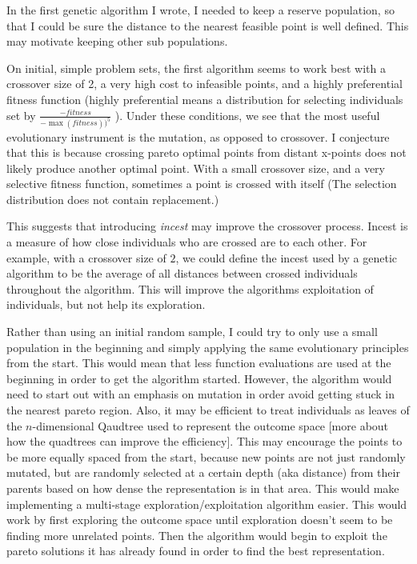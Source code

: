 \documentclass{article}
\begin{document}
In the first genetic algorithm I wrote, I needed to keep a reserve population, so that I could be sure the distance to the nearest feasible point is well defined.
This may motivate keeping other sub populations.


On initial, simple problem sets, the first algorithm seems to work best with a crossover size of 2, a very high cost to infeasible points, and a highly preferential fitness function
(highly preferential means a distribution for selecting individuals set by $\frac{-fitness }{ -\max(fitness))^5}$  ).
Under these conditions, we see that the most useful evolutionary instrument is the mutation, as opposed to crossover.
I conjecture that this is because crossing pareto optimal points from distant x-points does not likely produce another optimal point.
With a small crossover size, and a very selective fitness function, sometimes a point is crossed with itself (The selection distribution does not contain replacement.)

This suggests that introducing \emph{incest} may improve the crossover process.
Incest is a measure of how close individuals who are crossed are to each other.
For example, with a crossover size of $2$, we could define the incest used by a genetic algorithm to be 
the average of all distances between crossed individuals throughout the algorithm.
This will improve the algorithms exploitation of individuals, but not help its exploration.

Rather than using an initial random sample, I could try to only use a small population in the beginning and simply applying the same evolutionary principles from the start.
This would mean that less function evaluations are used at the beginning in order to get the algorithm started.
However, the algorithm would need to start out with an emphasis on mutation in order avoid getting stuck in the nearest pareto region.
Also, it may be efficient to treat individuals as leaves of the $n$-dimensional Qaudtree used to represent the outcome space [more about how the quadtrees can improve the efficiency].
This may encourage the points to be more equally spaced from the start, because new points are not just randomly mutated, but are randomly 
selected at a certain depth (aka distance) from their parents based on how dense the representation is in that area.
This would make implementing a multi-stage exploration/exploitation algorithm easier.
This would work by first exploring the outcome space until exploration doesn't seem to be finding more unrelated points.
Then the algorithm would begin to exploit the pareto solutions it has already found in order to find the best representation.
\end{document}
